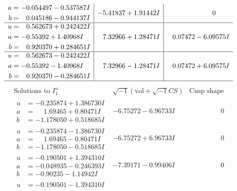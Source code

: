 \documentclass[1p]{elsarticle_modified}
\theoremstyle{definition}
\newcommand{\I}{\sqrt{-1}}
\begin{document}
$$\begin{array}{c|c|c}
\begin{aligned}
a &= -0.054497 - 0.537587 I \\
b &= \phantom{-}0.045186 - 0.944137 I\end{aligned}
 & -5.41837 + 1.91442 I & \phantom{-0.000000 } 0 \\ \hline\begin{aligned}
u &= \phantom{-}0.562673 + 0.242422 I \\
a &= -0.55392 + 1.40968 I \\
b &= \phantom{-}0.920370 + 0.284651 I\end{aligned}
 & \phantom{-}7.32966 + 1.28471 I & \phantom{-}0.07472 - 6.09575 I \\ \hline\begin{aligned}
u &= \phantom{-}0.562673 - 0.242422 I \\
a &= -0.55392 - 1.40968 I \\
b &= \phantom{-}0.920370 - 0.284651 I\end{aligned}
 & \phantom{-}7.32966 - 1.28471 I & \phantom{-}0.07472 + 6.09575 I\\
 \hline 
 \end{array}$$\newpage$$\begin{array}{c|c|c}  
\text{Solutions to }I^u_{1}& \I (\text{vol} + \sqrt{-1}CS) & \text{Cusp shape}\\
 \hline 
\begin{aligned}
u &= -0.235874 + 1.386730 I \\
a &= \phantom{-}1.69465 + 0.80471 I \\
b &= -1.178050 + 0.518685 I\end{aligned}
 & -6.75272 - 6.96733 I & \phantom{-0.000000 } 0 \\ \hline\begin{aligned}
u &= -0.235874 - 1.386730 I \\
a &= \phantom{-}1.69465 - 0.80471 I \\
b &= -1.178050 - 0.518685 I\end{aligned}
 & -6.75272 + 6.96733 I & \phantom{-0.000000 } 0 \\ \hline\begin{aligned}
u &= -0.190501 + 1.394310 I \\
a &= -0.048935 - 0.246393 I \\
b &= -0.90235 - 1.14942 I\end{aligned}
 & -7.39171 - 0.99406 I & \phantom{-0.000000 } 0 \\ \hline\begin{aligned}
u &= -0.190501 - 1.394310 I \\

\end{aligned}
\end{array}$$
\end{document}
